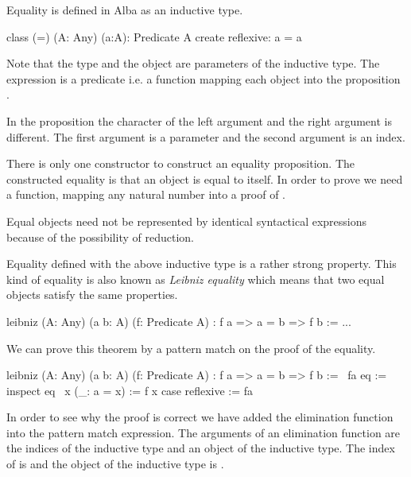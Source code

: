 Equality is defined in Alba as an inductive type.
\begin{alba}
    class
        (=) (A: Any) (a:A): Predicate A
    create
        reflexive: a = a
\end{alba}

Note that the type  and the object  are parameters of the
inductive type. The expression  is a predicate i.e. a function
 mapping each object  into the
proposition .

In the proposition  the character of the left argument  and
the right argument  is different. The first argument is a parameter and
the second argument is an index.

There is only one constructor to construct an equality proposition. The
constructed equality is that an object is equal to itself. In order to prove
 we need a function, mapping any natural
number  into a proof of .

Equal objects need not be represented by identical syntactical expressions
because of the possibility of reduction.

Equality defined with the above inductive type is a rather strong
property. This kind of equality is also known as \emph{Leibniz equality} which
means that two equal objects satisfy the same properties.
%
\begin{alba}
    leibniz
        (A: Any)
        (a b: A)
        (f: Predicate A)
        : f a => a = b => f b
    :=
        ...
\end{alba}


We can prove this theorem by a pattern match on the proof of the equality.

\begin{alba}
    leibniz
        (A: Any)
        (a b: A)
        (f: Predicate A)
        : f a => a = b => f b
    :=
        \ fa eq :=
            inspect
                eq
                \ x (_: a = x) := f x
            case
                reflexive := fa
\end{alba}

In order to see why the proof is correct we have added the elimination function
into the pattern match expression. The arguments of an elimination function are
the indices of the inductive type and an object of the inductive type. The index
of  is  and the object of the inductive type is .

